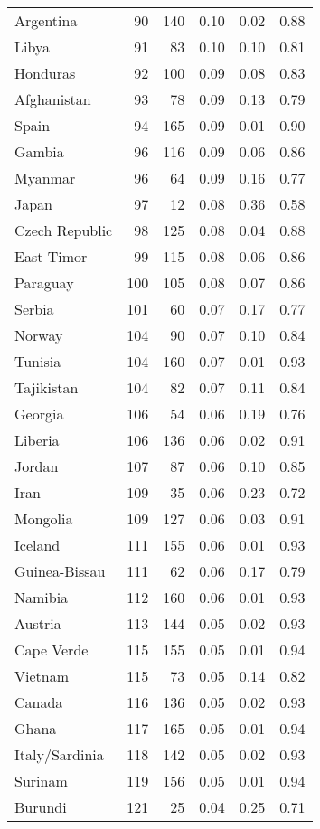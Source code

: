 \begin{longtable}[t]{lrrrrr}
Argentina & 90 & 140 & 0.10 & 0.02 & 0.88\\
\addlinespace
Libya & 91 & 83 & 0.10 & 0.10 & 0.81\\
Honduras & 92 & 100 & 0.09 & 0.08 & 0.83\\
Afghanistan & 93 & 78 & 0.09 & 0.13 & 0.79\\
Spain & 94 & 165 & 0.09 & 0.01 & 0.90\\
Gambia & 96 & 116 & 0.09 & 0.06 & 0.86\\
\addlinespace
Myanmar & 96 & 64 & 0.09 & 0.16 & 0.77\\
Japan & 97 & 12 & 0.08 & 0.36 & 0.58\\
Czech Republic & 98 & 125 & 0.08 & 0.04 & 0.88\\
East Timor & 99 & 115 & 0.08 & 0.06 & 0.86\\
Paraguay & 100 & 105 & 0.08 & 0.07 & 0.86\\
\addlinespace
Serbia & 101 & 60 & 0.07 & 0.17 & 0.77\\
Norway & 104 & 90 & 0.07 & 0.10 & 0.84\\
Tunisia & 104 & 160 & 0.07 & 0.01 & 0.93\\
Tajikistan & 104 & 82 & 0.07 & 0.11 & 0.84\\
Georgia & 106 & 54 & 0.06 & 0.19 & 0.76\\
\addlinespace
Liberia & 106 & 136 & 0.06 & 0.02 & 0.91\\
Jordan & 107 & 87 & 0.06 & 0.10 & 0.85\\
Iran & 109 & 35 & 0.06 & 0.23 & 0.72\\
Mongolia & 109 & 127 & 0.06 & 0.03 & 0.91\\
Iceland & 111 & 155 & 0.06 & 0.01 & 0.93\\
\addlinespace
Guinea-Bissau & 111 & 62 & 0.06 & 0.17 & 0.79\\
Namibia & 112 & 160 & 0.06 & 0.01 & 0.93\\
Austria & 113 & 144 & 0.05 & 0.02 & 0.93\\
Cape Verde & 115 & 155 & 0.05 & 0.01 & 0.94\\
Vietnam & 115 & 73 & 0.05 & 0.14 & 0.82\\
\addlinespace
Canada & 116 & 136 & 0.05 & 0.02 & 0.93\\
Ghana & 117 & 165 & 0.05 & 0.01 & 0.94\\
Italy/Sardinia & 118 & 142 & 0.05 & 0.02 & 0.93\\
Surinam & 119 & 156 & 0.05 & 0.01 & 0.94\\
Burundi & 121 & 25 & 0.04 & 0.25 & 0.71\\

\end{longtable}
